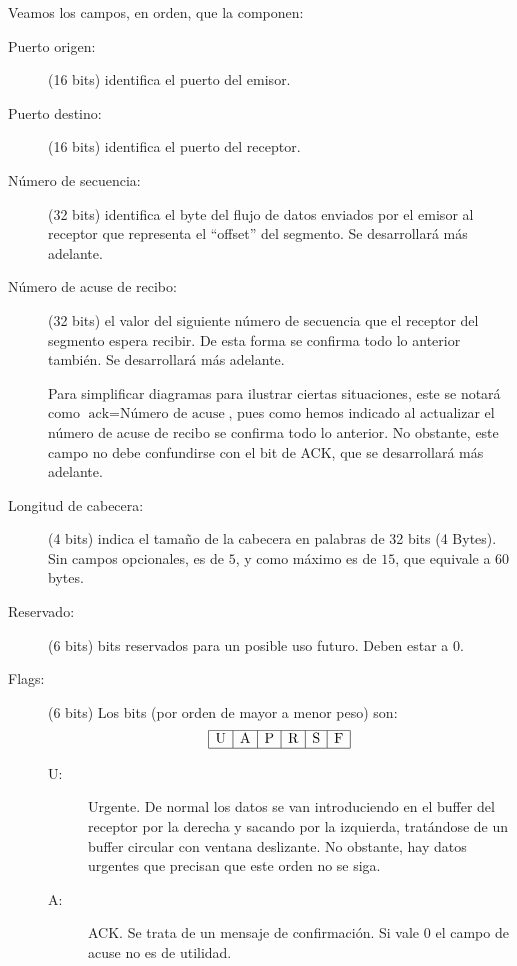 Veamos los campos, en orden, que la componen:
\begin{description}
    \item [Puerto origen:] (16 bits) identifica el puerto del emisor.
    \item [Puerto destino:] (16 bits) identifica el puerto del receptor.
    \item [Número de secuencia:] (32 bits) identifica el byte del flujo de datos enviados por el emisor al receptor que representa el ``offset'' del segmento. Se desarrollará más adelante.
    \item [Número de acuse de recibo:] (32 bits) el valor del siguiente número de secuencia que el receptor del segmento espera recibir. De esta forma se confirma todo lo anterior también. Se desarrollará más adelante.
    \begin{observacion}
        Para simplificar diagramas para ilustrar ciertas situaciones, este se notará como $\text{ack}=\text{Número de acuse}$, pues como hemos indicado al actualizar el número de acuse de recibo se confirma todo lo anterior. No obstante, este campo no debe confundirse con el bit de ACK, que se desarrollará más adelante.
    \end{observacion}
    \item [Longitud de cabecera:] (4 bits) indica el tamaño de la cabecera en palabras de 32 bits (4 Bytes). Sin campos opcionales, es de $5$, y como máximo es de $15$, que equivale a $60$ bytes.
    \item [Reservado: ] (6 bits) bits reservados para un posible uso futuro. Deben estar a $0$.
    \item [Flags: ] (6 bits) Los bits (por orden de mayor a menor peso) son:
        \begin{equation*}
            \begin{array}{|c|c|c|c|c|c|}
                \hline
                \text{U} & \text{A} & \text{P} & \text{R} & \text{S} & \text{F}\\
                \hline
            \end{array}
        \end{equation*}
        \begin{description}
            \item [U:] Urgente. De normal los datos se van introduciendo en el buffer del receptor por la derecha y sacando por la izquierda, tratándose de un buffer circular con ventana deslizante. No obstante, hay datos urgentes que precisan que este orden no se siga. 
            \item [A:] \acrshort{ACK}. Se trata de un mensaje de confirmación. Si vale 0 el campo de acuse no es de utilidad.

\end{description}
\end{description}
